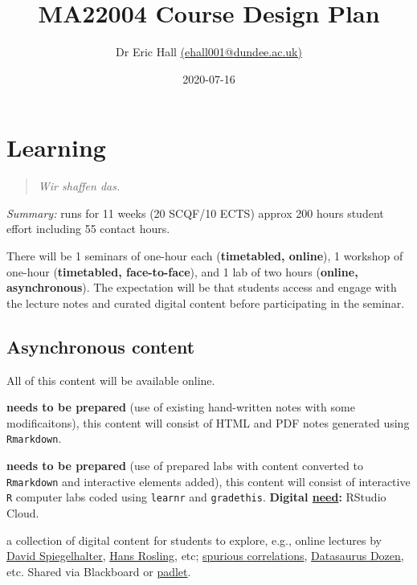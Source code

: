\documentclass[
]{book}
\title{MA22004 Course Design Plan}
\author{Dr Eric Hall \href{mailto:ehall001@dundee.ac.uk}{(ehall001@dundee.ac.uk)}}
\date{2020-07-16}
\providecommand{\tightlist}{%
  \setlength{\itemsep}{0pt}\setlength{\parskip}{0pt}}
\begin{document}
\maketitle

{
\setcounter{tocdepth}{1}
\tableofcontents
}
\hypertarget{learning}{%
\chapter{Learning}\label{learning}}

\begin{quote}
\emph{Wir shaffen das.}
\end{quote}

\emph{Summary:} runs for 11 weeks (20 SCQF/10 ECTS) approx 200 hours student effort including 55 contact hours.

There will be 1 seminars of one-hour each (\textbf{timetabled, online}), 1 workshop of one-hour (\textbf{timetabled, face-to-face}), and 1 lab of two hours (\textbf{online, asynchronous}). The expectation will be that students access and engage with the lecture notes and curated digital content before participating in the seminar.

\hypertarget{asynchronous-content}{%
\section*{Asynchronous content}\label{asynchronous-content}}

All of this content will be available online.

\begin{description}
\tightlist
\item[Course notes (ACQUIRING)]
\textbf{needs to be prepared} (use of existing hand-written notes with some modificaitons), this content will consist of HTML and PDF notes generated using \texttt{Rmarkdown}.
\item[Interactive computer labs (PRODUCING, PRACTICING)]
\textbf{needs to be prepared} (use of prepared labs with content converted to \texttt{Rmarkdown} and interactive elements added), this content will consist of interactive \texttt{R} computer labs coded using \texttt{learnr} and \texttt{gradethis}. \textbf{Digital \protect\hyperlink{needs}{need}:} RStudio Cloud.
\item[Curated digital content (INQUIRING)]
a collection of digital content for students to explore, e.g., online lectures by \href{https://www.youtube.com/watch?v=a1PtQ67urG4}{David Spiegelhalter}, \href{https://www.youtube.com/watch?v=hVimVzgtD6w}{Hans Rosling}, etc; \href{http://tylervigen.com/spurious-correlations}{spurious correlations}, \href{\%5Bhttps://www.autodeskresearch.com/publications/samestats}{Datasaurus Dozen}, etc. Shared via Blackboard or \href{https://padlet.com/}{padlet}.
\end{description}
\end{document}
